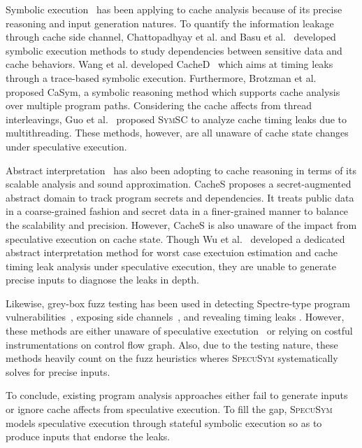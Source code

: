 \documentclass[sigconf]{acmart}
\newcommand{\SpecuSym}{\textsc{SpecuSym} }
\begin{document}
Symbolic execution~\cite{King76} has been applying to cache analysis because
of its precise reasoning and input generation natures. To quantify the 
information leakage through cache side channel, Chattopadhyay et al.
\cite{ChattopadhyayBRZ17,Chattopadhyay17} and Basu et al.~\cite{BasuC17}
developed symbolic execution methods to study dependencies between sensitive 
data and cache behaviors. Wang et al. developed CacheD~\cite{WangWLZW17} which 
aims at timing leaks through a trace-based symbolic execution. Furthermore, 
Brotzman et al.~\cite{BrotzmanLZTK2018} proposed CaSym, a symbolic reasoning 
method which supports cache analysis over multiple program paths. Considering
the cache affects from thread interleavings, Guo et al.~\cite{GuoWW18} proposed
\textsc{SymSC} to analyze cache timing leaks due to multithreading. These methods,
however, are all unaware of cache state changes under speculative execution.  


Abstract interpretation~\cite{CousotC77} has also been adopting to cache 
reasoning in terms of its scalable analysis and sound approximation. CacheS
\cite{CacheS} proposes a secret-augmented abstract domain to track program 
secrets and dependencies. It treats public data in a coarse-grained fashion 
and secret data in a finer-grained manner to balance the scalability and 
precision. However, CacheS is also unaware of the impact from speculative 
execution on cache state. Though Wu et al.~\cite{WuW19} developed a dedicated 
abstract interpretation method for worst case exectuion estimation and cache 
timing leak analysis under speculative execution, they are unable to generate 
precise inputs to diagnose the leaks in depth. 


Likewise, grey-box fuzz testing has been used in detecting Spectre-type
\cite{KocherGGHHLMPSY19} program vulnerabilities~\cite{OleksenkoTSF19}, 
exposing side channels~\cite{NilizadehNP19}, and revealing timing leaks
\cite{HeEC19}. However, these methods are either unaware of speculative 
exectution~\cite{NilizadehNP19,HeEC19} or relying on costful 
instrumentations on control flow graph. Also, due to the testing nature, 
these methods heavily count on the fuzz heuristics wheres \SpecuSym 
systematically solves for precise inputs.


To conclude, existing program analysis approaches either fail to 
generate inputs or ignore cache affects from speculative execution. 
To fill the gap, \SpecuSym models speculative execution through 
stateful symbolic execution so as to produce inputs that endorse 
the leaks. 
\end{document}
